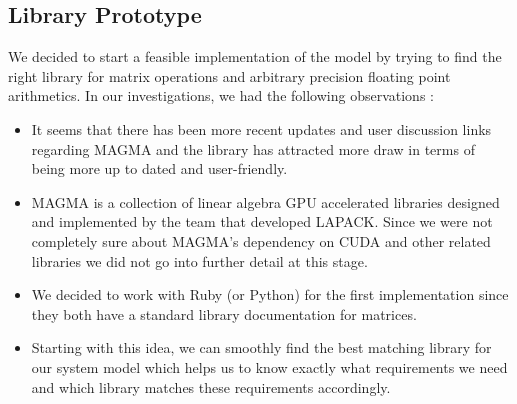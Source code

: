 \documentclass[11pt, letterpaper, oneside]{article}
\begin{document}
\subsection{ Library Prototype\\}

We decided to start a feasible implementation of the model by trying to find the right library
for matrix operations and arbitrary precision floating point arithmetics. In our investigations,
we had the following observations :

\begin{itemize}
 
\item It seems that there has been more recent updates and user discussion links regarding MAGMA
and the library has attracted more draw in terms of being more up to dated and user-friendly.
\item MAGMA is a collection of linear algebra GPU accelerated libraries designed and implemented
by the team that developed LAPACK. Since we were not completely sure about MAGMA's dependency on
CUDA and other related libraries we did not go into further detail at this stage.
\item We decided to work with Ruby (or Python) for the first implementation since they both have a
standard library documentation for matrices.
\item Starting with this idea, we can smoothly find the best matching library for our system 
model which helps us to know exactly what requirements we need and which library matches these 
requirements accordingly.
\end{itemize}




\end{document}
